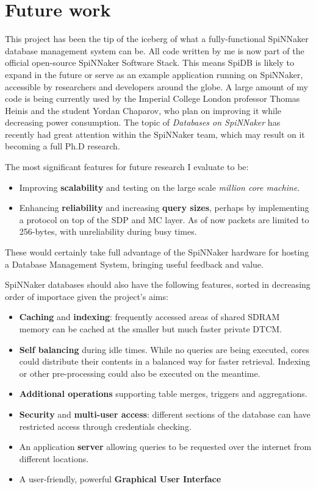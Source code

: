 \section{Future work}
This project has been the tip of the iceberg of what a fully-functional SpiNNaker database management system can be. All code written by me is now part of the official open-source SpiNNaker Software Stack. This means SpiDB is likely to expand in the future or serve as an example application running on SpiNNaker, accessible by researchers and developers around the globe. A large amount of my code is being currently used by the Imperial College London professor Thomas Heinis and the student Yordan Chaparov, who plan on improving it while decreasing power consumption. The topic of \textit{Databases on SpiNNaker} has recently had great attention within the SpiNNaker team, which may result on it becoming a full Ph.D research.

The most significant features for future research I evaluate to be:

\begin{itemize}
	\item Improving \textbf{scalability} and testing on the large scale \textit{million core machine}.
	\item Enhancing \textbf{reliability} and increasing \textbf{query sizes}, perhaps by implementing a protocol on top of the SDP and MC layer. As of now packets are limited to 256-bytes, with unreliability during busy times.
\end{itemize}

These would certainly take full advantage of the SpiNNaker hardware for hosting a Database Management System, bringing useful feedback and value.

SpiNNaker databases should also have the following features, sorted in decreasing order of importace given the project's aims:

\begin{itemize}
	\item \textbf{Caching} and \textbf{indexing}: frequently accessed areas of shared SDRAM memory can be cached at the smaller but much faster private DTCM.
	\item \textbf{Self balancing} during idle times. While no queries are being executed, cores could distribute their contents in a balanced way for faster retrieval. Indexing or other pre-processing could also be executed on the meantime.	
	\item \textbf{Additional operations} supporting table merges, triggers and aggregations.
	\item \textbf{Security} and \textbf{multi-user access}: different sections of the database can have restricted access through credentials checking.
	\item An application \textbf{server} allowing queries to be requested over the internet from different locations.
	\item A user-friendly, powerful \textbf{Graphical User Interface}
\end{itemize}